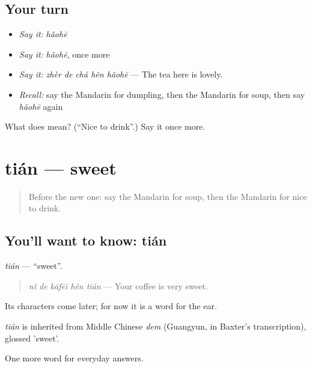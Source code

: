 \subsection*{Your turn}
\begin{itemize}
\raggedright
  \item \emph{Say it:} \emph{hǎohē}
  \item \emph{Say it:} \emph{hǎohē}, once more
  \item \emph{Say it:} \emph{zhèr de chá hěn hǎohē} — The tea here is lovely.
  \item \emph{Recall:} say the Mandarin for dumpling, then the Mandarin for soup, then say \emph{hǎohē} again
\end{itemize}

\begin{tcolorbox}[breakable,colback=teal!4,colframe=teal!35!black,title={Before you move on}]
What does  mean? (\textquotedblleft{}Nice to drink\textquotedblright{}.) Say it once more.
\end{tcolorbox}
\section[tián]{tián — sweet}

\label{lesson:ZH-C71-tian}



\begin{quote}
Before the new one: say the Mandarin for soup, then the Mandarin for nice to drink.
\end{quote}

\subsection*{You'll want to know: tián}
\emph{tián} — \textquotedblleft{}sweet\textquotedblright{}.

\begin{quote}
\emph{nǐ de kāfēi hěn tián} — Your coffee is very sweet.
\end{quote}

Its characters come later; for now it is a word for the ear.

\begin{cousinweb}
\emph{tián} is inherited from Middle Chinese \emph{dem} (Guangyun, in Baxter's transcription), glossed 'sweet'.
\end{cousinweb}

\begin{grammarlens}[title={What you've built}]
One more word for everyday answers.
\end{grammarlens}


